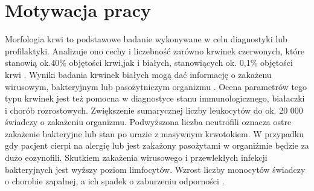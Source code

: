 \section{Motywacja pracy}
\label{sec:motywacja_pracy}
Morfologia krwi to podstawowe badanie wykonywane w celu diagnostyki lub profilaktyki. Analizuje ono cechy i liczebność zarówno krwinek czerwonych, które stanowią ok.40\% objętości krwi,jak i białych, stanowiących ok. 0,1\% objętości krwi \cite{krwiodawcy_sklad_krwi}. Wyniki badania krwinek białych mogą dać informację o zakażenu wirusowym, bakteryjnym lub pasożytniczym organizmu \cite{morfologia_krwi_wyniki_interpretacja}. Ocena parametrów tego typu krwinek jest też pomocna w diagnostyce stanu immunologicznego, białaczki i chorób rozrostowych. Zwiększenie sumarycznej liczby leukocytów do ok. 20 000 świadczy o zakażeniu organizmu. Podwyższona liczba neutrofili oznacza ostre zakażenie bakteryjne lub stan po urazie z masywnym krwotokiem. W przypadku gdy pacjent cierpi na alergię lub jest zakażony pasożytami w organiźmie będzie za dużo eozynofili. Skutkiem zakażenia wirusowego i przewlekłych infekcji bakteryjnych jest wyższy poziom limfocytów. Wzrost liczby monocytów świadczy o chorobie zapalnej, a ich spadek o zaburzeniu odporności \cite{morfologia_krwi_wyniki_interpretacja}.


